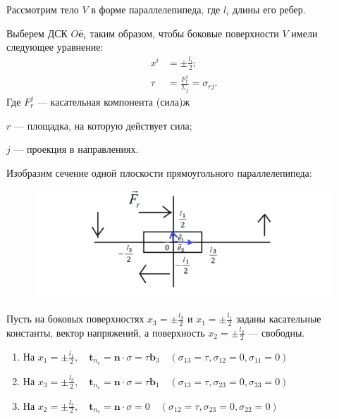 
Рассмотрим тело $V$ в форме параллелепипеда, где $l_i$ длины его ребер. 

Выберем ДСК $O\bar{\mathbf{e}}_i$ таким образом, чтобы боковые поверхности $V$ имели следующее уравнение:
\begin{align*}
	x^i &= \pm \frac{l_i}{2}; \\
	\tau &= \frac{F^j_r}{\Sigma_j} = \sigma_{rj}.
\end{align*}
Где 
$F^j_r$ --- касательная компонента (сила)ж

$r$ --- площадка, на которую действует сила;

$j$ --- проекция в направлениях.

Изобразим сечение одной плоскости прямоугольного параллелепипеда:

\begin{figure}[H]
	\centering
	\includegraphics[width=0.7\linewidth]{semester8/img/27}
	\caption{}
	\label{fig:27}
\end{figure}

Пусть на боковых поверхностях $x_3 = \pm \frac{l_3}{2}$ и $x_1 = \pm \frac{l_1}{2}$ заданы касательные константы, вектор напряжений, а поверхность $x_2 = \pm \frac{l_2}{2}$ --- свободны. 

\begin{enumerate}
	\item На $x_1 = \pm \frac{l_1}{2}, \quad \mathbf{t}_{n_e} = \mathbf{n} \cdot \sigma = \tau \mathbf{b}_3 \quad (\sigma_{13} = \tau, \sigma_{12} = 0, \sigma_{11} = 0)$
		
	\item На $x_3 = \pm \frac{l_3}{2}, \quad \mathbf{t}_{n_e} = \mathbf{n} \cdot \sigma = \tau \mathbf{b}_1 \quad (\sigma_{13} = \tau, \sigma_{23} = 0, \sigma_{33} = 0)$
	
	\item На $x_2 = \pm \frac{l_2}{2}, \quad \mathbf{t}_{n_e} = \mathbf{n} \cdot \sigma = 0 \quad (\sigma_{12} = \tau, \sigma_{23} = 0, \sigma_{22} = 0)$
\end{enumerate}

